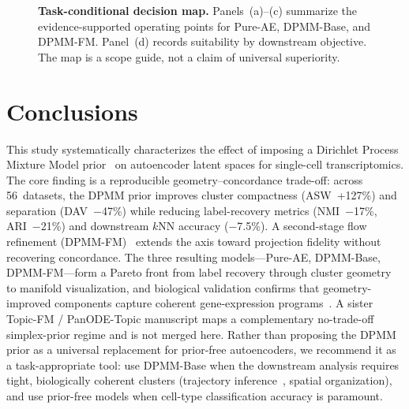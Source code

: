 \documentclass[biology,article,submit,pdftex,moreauthors]{Definitions/mdpi}
\begin{document}
\begin{figure}[H]
\centering

\caption{\textbf{Task-conditional decision map.} Panels~(a)--(c) summarize the evidence-supported operating points for Pure-AE, DPMM-Base, and DPMM-FM. Panel~(d) records suitability by downstream objective. The map is a scope guide, not a claim of universal superiority.}
\label{fig:decision-map}
\end{figure}

\FloatBarrier
\section{Conclusions}\label{sec:conclusions}
This study systematically characterizes the effect of imposing a Dirichlet Process Mixture Model prior~\cite{ferguson1973bayesian,neal2000markov} on autoencoder latent spaces for single-cell transcriptomics. The core finding is a reproducible geometry--concordance trade-off: across 56~datasets, the DPMM prior improves cluster compactness (ASW~+127\%) and separation (DAV~$-$47\%) while reducing label-recovery metrics (NMI~$-$17\%, ARI~$-$21\%) and downstream $k$NN accuracy ($-$7.5\%). A second-stage flow refinement (DPMM-FM)~\cite{lipman2023flow} extends the axis toward projection fidelity without recovering concordance. The three resulting models---Pure-AE, DPMM-Base, DPMM-FM---form a Pareto front from label recovery through cluster geometry to manifold visualization, and biological validation confirms that geometry-improved components capture coherent gene-expression programs~\cite{ashburner2000gene}. A sister Topic-FM / PanODE-Topic manuscript maps a complementary no-trade-off simplex-prior regime and is not merged here. Rather than proposing the DPMM prior as a universal replacement for prior-free autoencoders, we recommend it as a task-appropriate tool: use DPMM-Base when the downstream analysis requires tight, biologically coherent clusters (trajectory inference~\cite{saelens2019comparison}, spatial organization), and use prior-free models when cell-type classification accuracy is paramount.

\vspace{6pt}






\end{document}
